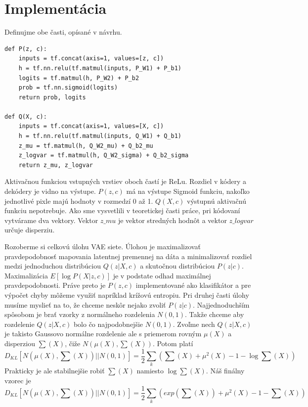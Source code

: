 \section{Implementácia}
Definujme obe časti, opísané v návrhu.

\begin{verbatim}
def P(z, c):
    inputs = tf.concat(axis=1, values=[z, c])
    h = tf.nn.relu(tf.matmul(inputs, P_W1) + P_b1)
    logits = tf.matmul(h, P_W2) + P_b2
    prob = tf.nn.sigmoid(logits)
    return prob, logits

def Q(X, c):
    inputs = tf.concat(axis=1, values=[X, c])
    h = tf.nn.relu(tf.matmul(inputs, Q_W1) + Q_b1)
    z_mu = tf.matmul(h, Q_W2_mu) + Q_b2_mu
    z_logvar = tf.matmul(h, Q_W2_sigma) + Q_b2_sigma
    return z_mu, z_logvar
\end{verbatim}

Aktivačnou funkciou vstupných vrstiev oboch častí je ReLu.
Rozdiel v kódery a dekódery je vidno na výstupe.
\(P(z, c)\) má na výstupe Sigmoid funkciu, nakoľko jednotlivé pixle majú hodnoty v rozmedzí 0 až 1.
\(Q(X, c)\) výstupnú aktivačnú funkciu nepotrebuje.
Ako sme vysvetlili v teoretickej časti práce, pri kódovaní vytvárame dva vektory.
Vektor \(z\_mu\) je vektor stredných hodnôt a vektor \(z\_logvar\) určuje disperziu.

Rozoberme si celkovú úlohu VAE siete.
Úlohou je maximalizovať pravdepodobnosť mapovania latentnej premennej na dáta a minimalizovať rozdiel medzi jednoduchou distribúciou \(Q(z|X,c)\) a skutočnou distribúciou \(P(z|c)\).
Maximalizácia \(E[\log P(X|z,c)]\) je v podstate odhad maximálnej pravdepodobnosti.
Práve preto je \(P(z, c)\) implementované ako klasifikátor a pre výpočet chyby môžeme využiť napríklad krížovú entropiu.
Pri druhej časti úlohy musíme myslieť na to, že chceme neskôr nejako zvoliť \(P(z|c)\).
Najjednoduchším spôsobom je brať vzorky z normálneho rozdelenia \(N(0,1)\).
Takže chceme aby rozdelenie \(Q(z|X,c)\) bolo čo najpodobnejšie \(N(0,1)\).
Zvoľme nech \(Q(z|X,c)\) je takisto Gaussovo normálne rozdelenie ale s priemerom rovným \(\mu(X)\) a disperziou \(\sum (X)\), čiže \(N(\mu(X), \sum (X))\).
Potom platí \[D_{KL}[N(\mu(X), \sum (X))||N(0,1)] = \frac{1}{2}  \sum_{k} (\sum (X) + \mu^{2} (X) - 1 - \log \sum (X))\]
Prakticky je ale stabilnejšie robiť \(\sum (X)\) namiesto \(\log \sum (X)\).
Náš finálny vzorec je \[D_{KL}[N(\mu(X), \sum (X))||N(0,1)] = \frac{1}{2}  \sum_{k} (exp(\sum (X)) + \mu^{2} (X) - 1 - \sum (X))\]

